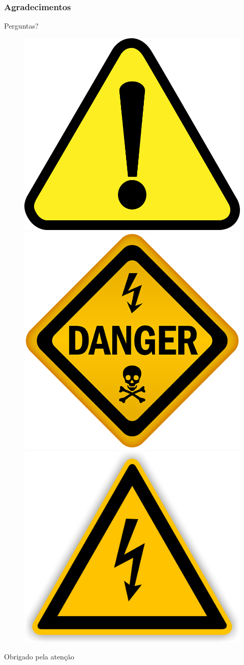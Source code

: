 \documentclass[12pt]{beamer}
\begin{document}
\begin{frame}
    \frametitle{Agradecimentos}
    \centering
    \Huge{Perguntas?}
    \begin{figure}
        \centering
        \includegraphics[width=.3\textwidth]{alerta.png}
        \includegraphics[width=.3\textwidth]{perigo.png}
        \includegraphics[width=.3\textwidth]{eletricidade.png}
    \end{figure}
    \Huge{Obrigado pela atenção}
\end{frame}
\end{document}
